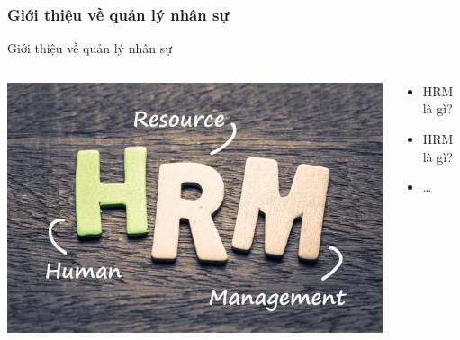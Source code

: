 \documentclass{beamer}
\begin{document}
\subsubsection{Giới thiệu về quản lý nhân sự}
\begin{frame}{Giới thiệu về quản lý nhân sự}
\begin{columns}

\begin{column}{0.4\textwidth}
\includegraphics[width=\textwidth]{pictures/Giới thiệu về HRM.png}
\end{column}

\begin{column}{0.6\textwidth}
\begin{itemize}
\item HRM là gì?
\item HRM là gì?
\item \dots
\end{itemize}
\end{column}

\end{columns}
\end{frame}

\end{document}
